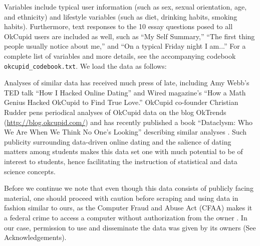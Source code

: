 \documentclass{article}
\begin{document}
Variables include typical user information (such as sex, sexual orientation, age, and ethnicity) and lifestyle variables (such as diet, drinking habits, smoking habits).  Furthermore, text responses to the 10 essay questions posed to all OkCupid users are included as well, such as ``My Self Summary,'' ``The first thing people usually notice about me,'' and ``On a typical Friday night I am...''  For a complete list of variables and more details, see the accompanying codebook \verb#okcupid_codebook.txt#.  We load the data as follows:

\begin{knitrout}
\color{fgcolor}\begin{kframe}
\begin{alltt}
 \hlkwb{<-} \hlstd{(}\hlstd{=}\hlstd{,} \hlstd{=}\hlstd{,} \hlstd{=}\hlstd{)}
\end{alltt}


{\ttfamily\noindent\bfseries{}}\begin{alltt}
 \hlkwb{<-} 
\end{alltt}


{\ttfamily\noindent\bfseries\color{errorcolor}{\#\# Error in nrow(profiles): object 'profiles' not found}}\end{kframe}
\end{knitrout}

Analyses of similar data has received much press of late, including Amy Webb's TED talk ``How I Hacked Online Dating'' \citep{TED} and Wired magazine's ``How a Math Genius Hacked OkCupid to Find True Love.'' \citep{Wired}  OkCupid co-founder Christian Rudder pens periodical analyses of OkCupid data on the blog OkTrends (\url{http://blog.okcupid.com/}) and has recently published a book ``Dataclysm: Who We Are When We Think No One's Looking'' describing similar analyses \citep{dataclysm}.  Such publicity surrounding data-driven online dating and the salience of dating matters among students makes this data set one with much potential to be of interest to students, hence facilitating the instruction of statistical and data science concepts.

Before we continue we note that even though this data consists of publicly facing material, one should proceed with caution before scraping and using data in fashion similar to ours, as the Computer Fraud and Abuse Act (CFAA) makes it a federal crime to access a computer without authorization from the owner \citep{Pando:2014}.  In our case, permission to use and disseminate the data was given by its owners (See Acknowledgements).
\end{document}
